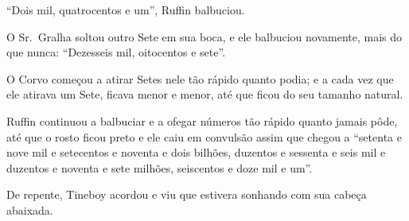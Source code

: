 ``Dois mil, quatrocentos e um'', Ruffin balbuciou.

O Sr.~Gralha soltou outro Sete em sua boca, e ele balbuciou novamente,
mais do que nunca: ``Dezesseis mil, oitocentos e sete''.

O Corvo começou a atirar Setes nele tão rápido quanto podia; e a cada
vez que ele atirava um Sete, ficava menor e menor, até que ficou do seu
tamanho natural.

Ruffin continuou a balbuciar e a ofegar números tão rápido quanto jamais
pôde, até que o rosto ficou preto e ele caiu em convulsão assim que
chegou a ``setenta e nove mil e setecentos e noventa e dois bilhões,
duzentos e sessenta e seis mil e duzentos e noventa e sete milhões,
seiscentos e doze mil e um''.

De repente, Tineboy acordou e viu que estivera sonhando com sua cabeça
abaixada.











